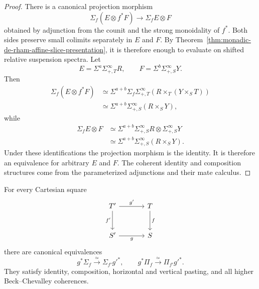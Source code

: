 \begin{proof}
There is a canonical projection morphism
\[
    \Sigma_f(E\otimes f^*F)
    \longrightarrow
    \Sigma_f E\otimes F
\]
obtained by adjunction from the counit and the strong monoidality of \(f^*\).  Both sides preserve
small colimits separately in \(E\) and \(F\).  By
Theorem~\ref{thm:monadic-de-rham-affine-slice-presentation}, it is therefore enough to evaluate on
shifted relative suspension spectra.  Let
\[
    E=\Sigma^a\Sigma^\infty_{+,T}R,
    \qquad
    F=\Sigma^b\Sigma^\infty_{+,S}Y.
\]
Then
\[
\begin{aligned}
    \Sigma_f(E\otimes f^*F)
    &\simeq
    \Sigma^{a+b}
    \Sigma_f\Sigma^\infty_{+,T}
    \left(
        R\times_T(Y\times_ST)
    \right)
    \\
    &\simeq
    \Sigma^{a+b}
    \Sigma^\infty_{+,S}(R\times_SY),
\end{aligned}
\]
while
\[
\begin{aligned}
    \Sigma_f E\otimes F
    &\simeq
    \Sigma^{a+b}
    \Sigma^\infty_{+,S}R
    \otimes
    \Sigma^\infty_{+,S}Y
    \\
    &\simeq
    \Sigma^{a+b}
    \Sigma^\infty_{+,S}(R\times_SY).
\end{aligned}
\]
Under these identifications the projection morphism is the identity.  It is therefore an equivalence
for arbitrary \(E\) and \(F\).  The coherent identity and composition structures come from the
parameterized adjunctions and their mate calculus.
\end{proof}

\begin{theorem}
\label{thm:monadic-de-rham-beck-chevalley}
For every Cartesian square
\[
\begin{tikzcd}[column sep=large,row sep=large]
    T' \ar[r,"g'"] \ar[d,"f'"'] & T \ar[d,"f"]\\
    S' \ar[r,"g"'] & S
\end{tikzcd}
\]
there are canonical equivalences
\[
\boxed{
    g^*\Sigma_f\xrightarrow{\simeq}\Sigma_{f'} g'^*,
    \qquad
    g^*\Pi_f\xrightarrow{\simeq}\Pi_{f'} g'^*.
}
\]
They satisfy identity, composition, horizontal and vertical pasting, and all higher
Beck--Chevalley coherences.
\end{theorem}

